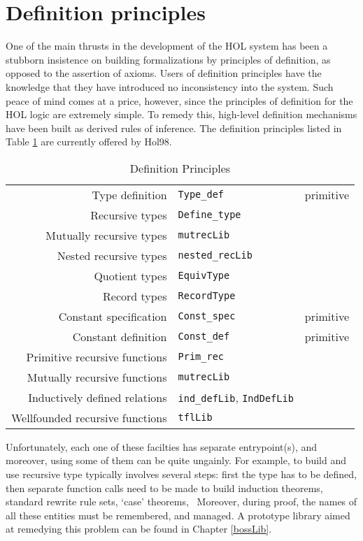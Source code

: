 \section{Definition principles}

One of the main thrusts in the development of the HOL system has been a
stubborn insistence on building formalizations by principles of
definition, as opposed to the assertion of axioms. Users of definition
principles have the knowledge that they have introduced no inconsistency
into the system.  Such peace of mind comes at a price, however, since
the principles of definition for the HOL logic are extremely simple. To
remedy this, high-level definition mechanisms have been built as derived
rules of inference. The definition principles listed in Table \ref{PoD}
are currently offered by Hol98.

\begin{table}[ht]
\begin{center}
\begin{tabular}{|r|l|r|} \hline
Type definition & \verb+Type_def+ & primitive \\
Recursive types & \verb+Define_type+ &  \\
Mutually recursive types & \verb+mutrecLib+ & \\
Nested recursive types & \verb+nested_recLib+ & \\ 
Quotient types & \verb+EquivType+ & \\
Record types & \verb+RecordType+ & \\\hline
Constant specification & \verb+Const_spec+ & primitive \\
Constant definition & \verb+Const_def+ & primitive \\
Primitive recursive functions & \verb+Prim_rec+ & \\
Mutually recursive functions & \verb+mutrecLib+ & \\
Inductively defined relations & \verb+ind_defLib+,  \verb+IndDefLib+ & \\
Wellfounded recursive functions & \verb+tflLib+ & \\
 \hline
\end{tabular}
\caption{Definition Principles}\label{PoD}
\end{center}\end{table}

Unfortunately, each one of these facilties has separate entrypoint(s),
and moreover, using some of them can be quite ungainly. For example, to
build and use recursive type typically involves several steps: first the
type has to be defined, then separate function calls need to be made to
build induction theorems, standard rewrite rule sets, `case' theorems,
\etc\ Moreover, during proof, the names of all these entities must be
remembered, and managed. A prototype library aimed at remedying this
problem can be found in Chapter \ref{bossLib}.

